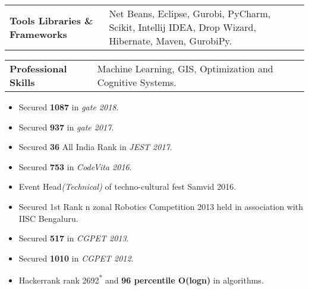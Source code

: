 \documentclass[10pt]{article}
\newcommand{\shadethis}[1]{ \begin{snugshade}#1\end{snugshade}}
\begin{document}
\begin{description}[style=nextline]
\begin{tabular}{p{2.1cm}|p{11cm}}
                {\bf{Tools\hspace{8mm} Libraries \&\hspace{8mm} Frameworks}}     & Net Beans, Eclipse, Gurobi, PyCharm, Scikit, Intellij IDEA, Drop Wizard, Hibernate, Maven, GurobiPy.       
            \end{tabular}
            
            \begin{tabular}{p{2.1cm}|p{10.5cm}}
                
                {\bf{Professional Skills}}     &Machine Learning, GIS, Optimization and Cognitive Systems.      
            \end{tabular}
        
        \shadethis{\item{}}
        \begin{itemize}            
            \item Secured \textbf{1087} in \emph{gate 2018}.
            \item Secured \textbf{937} in \emph{gate 2017}.
            \item Secured \textbf{36} All India Rank in \emph{JEST 2017}.
            \item Secured \textbf{753} in \emph{CodeVita 2016}.
            \item Event Head\emph{(Technical)} of techno-cultural fest Samvid 2016.
            \item Secured 1st Rank n zonal Robotics Competition 2013 held in association with IISC Bengaluru.
            \item Secured \textbf{517} in \emph{CGPET 2013}.
            \item Secured \textbf{1010} in \emph{CGPET 2012}.
            \item Hackerrank rank 2692\textsuperscript{*} and \textbf{96 percentile O(logn)} in algorithms.
        \end{itemize}
    
    \end{description}
\end{document}
